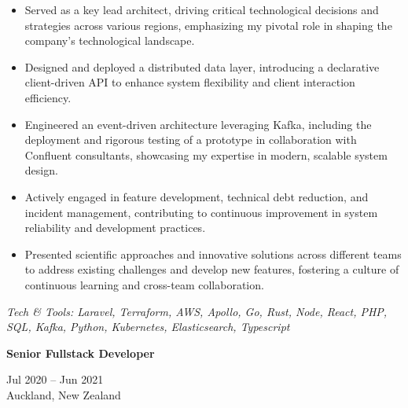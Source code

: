 \documentclass[10pt,a4paper,ragged2e,withhyper]{altacv}
\renewcommand{\cvevent}[4]{%
  \textbf{#1} %
  \hfill %
  \begin{minipage}[t]{.5\linewidth}
    \raggedleft %
    \small#3 %
    \\ %
    #4 %
  \end{minipage}
  \vspace{\baselineskip} %
}
\begin{document}
\begin{itemize}
  \item Served as a key lead architect, driving critical technological decisions and strategies across various regions, emphasizing my pivotal role in shaping the company’s technological landscape.
  \item Designed and deployed a distributed data layer, introducing a declarative client-driven API to enhance system flexibility and client interaction efficiency.
  \item Engineered an event-driven architecture leveraging Kafka, including the deployment and rigorous testing of a prototype in collaboration with Confluent consultants, showcasing my expertise in modern, scalable system design.
  \item Actively engaged in feature development, technical debt reduction, and incident management, contributing to continuous improvement in system reliability and development practices.
  \item Presented scientific approaches and innovative solutions across different teams to address existing challenges and develop new features, fostering a culture of continuous learning and cross-team collaboration.
\end{itemize}



\vspace{0.5cm}

\textit{Tech \& Tools: Laravel, Terraform, AWS, Apollo, Go, Rust, Node, React, PHP, SQL, Kafka, Python, Kubernetes, Elasticsearch, Typescript}

\divider

\cvevent{Senior Fullstack Developer}{ezyVet}{Jul 2020 -- Jun 2021}{Auckland, New Zealand}
\end{document}
